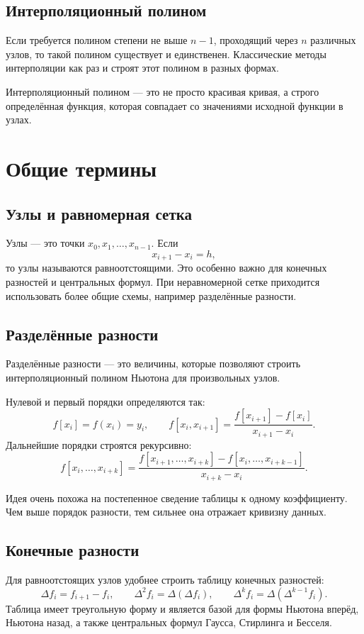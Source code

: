 \documentclass[12pt,a4paper]{article}
\begin{document}
\subsection{Интерполяционный полином}
Если требуется полином степени не выше $n-1$, проходящий через $n$ различных узлов, то такой полином существует и единственен. Классические методы интерполяции как раз и строят этот полином в разных формах.

\begin{formbox}
Интерполяционный полином --- это не просто красивая кривая, а строго определённая функция, которая совпадает со значениями исходной функции в узлах.
\end{formbox}

\section{Общие термины}
\subsection{Узлы и равномерная сетка}
Узлы --- это точки $x_0,x_1,\dots,x_{n-1}$. Если
\[
 x_{i+1}-x_i=h,
\]
то узлы называются равноотстоящими. Это особенно важно для конечных разностей и центральных формул. При неравномерной сетке приходится использовать более общие схемы, например разделённые разности.

\subsection{Разделённые разности}
\begin{defbox}
Разделённые разности --- это величины, которые позволяют строить интерполяционный полином Ньютона для произвольных узлов.
\end{defbox}

Нулевой и первый порядки определяются так:
\[
f[x_i]=f(x_i)=y_i,
\qquad
f[x_i,x_{i+1}]=\frac{f[x_{i+1}]-f[x_i]}{x_{i+1}-x_i}.
\]
Дальнейшие порядки строятся рекурсивно:
\[
f[x_i,\dots,x_{i+k}] = \frac{f[x_{i+1},\dots,x_{i+k}] - f[x_i,\dots,x_{i+k-1}]}{x_{i+k}-x_i}.
\]

Идея очень похожа на постепенное сведение таблицы к одному коэффициенту. Чем выше порядок разности, тем сильнее она отражает кривизну данных.

\subsection{Конечные разности}
Для равноотстоящих узлов удобнее строить таблицу конечных разностей:
\[
\Delta f_i=f_{i+1}-f_i,\qquad
\Delta^2 f_i=\Delta(\Delta f_i),\qquad
\Delta^k f_i=\Delta(\Delta^{k-1} f_i).
\]
Таблица имеет треугольную форму и является базой для формы Ньютона вперёд, Ньютона назад, а также центральных формул Гаусса, Стирлинга и Бесселя.
\end{document}
